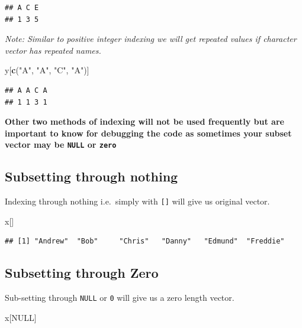 \documentclass[
]{book}
\newenvironment{Shaded}{\begin{snugshade}}{\end{snugshade}}
\newcommand{\ConstantTok}[1]{\textcolor[rgb]{0.56,0.35,0.01}{#1}}
\newcommand{\FunctionTok}[1]{\textcolor[rgb]{0.13,0.29,0.53}{\textbf{#1}}}
\newcommand{\NormalTok}[1]{#1}
\newcommand{\StringTok}[1]{\textcolor[rgb]{0.31,0.60,0.02}{#1}}
\begin{document}
\begin{verbatim}
## A C E 
## 1 3 5
\end{verbatim}

\emph{Note: Similar to positive integer indexing we will get repeated values if character vector has repeated names.}

\begin{Shaded}
\begin{Highlighting}[]
\NormalTok{y[}\FunctionTok{c}\NormalTok{(}\StringTok{"A"}\NormalTok{, }\StringTok{"A"}\NormalTok{, }\StringTok{"C"}\NormalTok{, }\StringTok{"A"}\NormalTok{)]}
\end{Highlighting}
\end{Shaded}

\begin{verbatim}
## A A C A 
## 1 1 3 1
\end{verbatim}

\textbf{Other two methods of indexing will not be used frequently but are important to know for debugging the code as sometimes your subset vector may be \texttt{NULL} or \texttt{zero}}

\hypertarget{subsetting-through-nothing}{%
\subsection{Subsetting through nothing}\label{subsetting-through-nothing}}

Indexing through nothing i.e.~simply with \texttt{{[}{]}} will give us original vector.

\begin{Shaded}
\begin{Highlighting}[]
\NormalTok{x[]}
\end{Highlighting}
\end{Shaded}

\begin{verbatim}
## [1] "Andrew"  "Bob"     "Chris"   "Danny"   "Edmund"  "Freddie"
\end{verbatim}

\hypertarget{subsetting-through-zero}{%
\subsection{Subsetting through Zero}\label{subsetting-through-zero}}

Sub-setting through \texttt{NULL} or \texttt{0} will give us a zero length vector.

\begin{Shaded}
\begin{Highlighting}[]
\NormalTok{x[}\ConstantTok{NULL}\NormalTok{]}
\end{Highlighting}
\end{Shaded}
\end{document}
